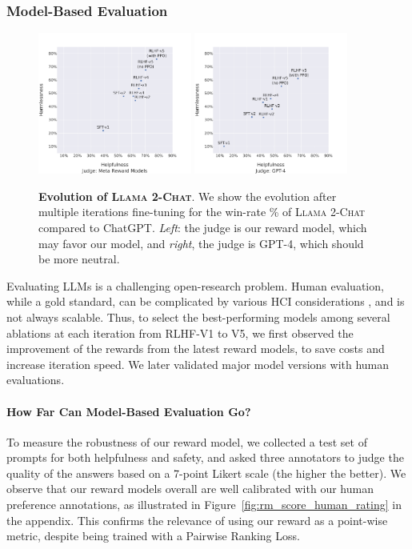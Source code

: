 \documentclass{article}
\newcommand{\modelname}{\textsc{Llama 2-Chat}\xspace}
\begin{document}
\subsubsection{Model-Based Evaluation}

\begin{figure}[htbp]
\centering
\includegraphics[width=0.45\textwidth]{img/evolution_of_chatllama_RM.pdf}
\includegraphics[width=0.45\textwidth]{img/evolution_of_chatllama_GPT4.pdf}
\caption{\textbf{Evolution of \modelname}. We show the evolution after multiple iterations fine-tuning for the win-rate \% of \modelname compared to ChatGPT. \textit{Left}: the judge is our reward model, which may favor our model, and \textit{right}, the judge is GPT-4, which should be more neutral.}
\label{fig:evolution_of_chatllama}
\end{figure}

Evaluating LLMs is a challenging open-research problem. Human evaluation, while a gold standard, can be complicated by various HCI considerations \citep{clark-etal-2021-thats, gehrmann-etal-2023-repairing}, and is not always scalable. Thus, to select the best-performing models among several ablations at each iteration from RLHF-V1 to V5, we first observed the improvement of the rewards from the latest reward models, to save costs and increase iteration speed. We later validated major model versions with human evaluations. 


\paragraph{How Far Can Model-Based Evaluation Go?}
To measure the robustness of our reward model, we collected a test set of prompts for both helpfulness and safety, and asked three annotators to judge the quality of the answers based on a 7-point Likert scale (the higher the better). 
We observe that our reward models overall are well calibrated with our human preference annotations, as illustrated in Figure~\ref{fig:rm_score_human_rating} in the appendix. This confirms the relevance of using our reward as a point-wise metric, despite being trained with a Pairwise Ranking Loss.
\end{document}
